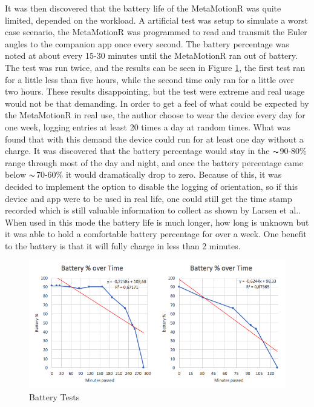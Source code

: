 It was then discovered that the battery life of the MetaMotionR was quite limited, depended on the workload. A artificial test was setup to simulate a worst case scenario, the MetaMotionR was programmed to read and transmit the Euler angles to the companion app once every second. The battery percentage was noted at about every 15-30 minutes until the MetaMotionR ran out of battery. The test was run twice, and the results can be seen in Figure \ref{battery_test}, the first test ran for a little less than five hours, while the second time only ran for a little over two hours. These results disappointing, but the test were extreme and real usage would not be that demanding. In order to get a feel of what could be expected by the MetaMotionR in real use, the author choose to wear the device every day for one week, logging entries at least 20 times a day at random times. What was found that with this demand the device could run for at least one day without a charge. It was discovered that the battery percentage would stay in the $\thicksim$90-80\% range through most of the day and night, and once the battery percentage came below $\thicksim$70-60\% it would dramatically drop to zero. Because of this, it was decided to implement the option to disable the logging of orientation, so if this device and app were to be used in real life, one could still get the time stamp recorded which is still valuable information to collect as shown by Larsen et al.\cite{eg}. When used in this mode the battery life is much longer, how long is unknown but it was able to hold a comfortable battery percentage for over a week. One benefit to the battery is that it will fully charge in less than 2 minutes.

\begin{figure}[h!]
    \centering
    \includegraphics[width=1\textwidth]{figures/batteryTest.png}
    \caption{Battery Tests}
    \label{battery_test}
\end{figure}

